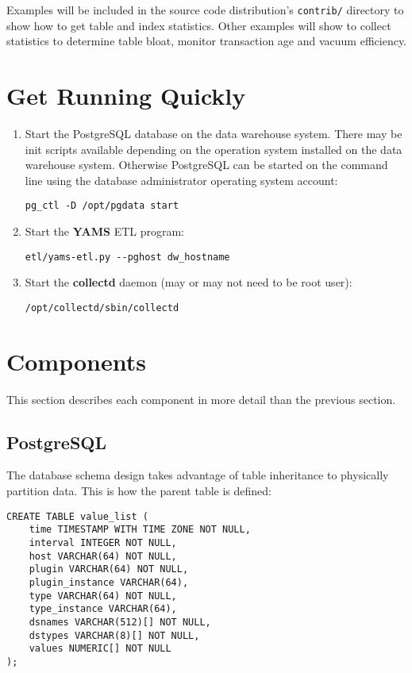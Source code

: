 \documentclass[a4paper,twoside,12pt]{article}
\begin{document}
Examples will be included in the source code distribution's \texttt{contrib/}
directory to show how to get table and index statistics.  Other examples will
show to collect statistics to determine table bloat, monitor transaction age
and vacuum efficiency.

\section{Get Running Quickly}

\begin{enumerate}
  \item Start the PostgreSQL database on the data warehouse system.  There may
        be init scripts available depending on the operation system installed
        on the data warehouse system.  Otherwise PostgreSQL can be started on
        the command line using the database administrator operating system
        account:
        \lstset{language=sh}
        \begin{lstlisting}
pg_ctl -D /opt/pgdata start
        \end{lstlisting}
  \item Start the \textbf{YAMS} ETL program:
        \lstset{language=sh}
        \begin{lstlisting}
etl/yams-etl.py --pghost dw_hostname
        \end{lstlisting}
  \item Start the \textbf{collectd} daemon (may or may not need to be root
        user):
        \lstset{language=sh}
        \begin{lstlisting}
/opt/collectd/sbin/collectd
        \end{lstlisting}
\end{enumerate}

\section{Components}

This section describes each component in more detail than the previous section.

\subsection{PostgreSQL}

The database schema design takes advantage of table inheritance to physically
partition data.  This is how the parent table is defined:
\lstset{language=sql}
\begin{lstlisting}
CREATE TABLE value_list (
    time TIMESTAMP WITH TIME ZONE NOT NULL,
    interval INTEGER NOT NULL,
    host VARCHAR(64) NOT NULL,
    plugin VARCHAR(64) NOT NULL,
    plugin_instance VARCHAR(64),
    type VARCHAR(64) NOT NULL,
    type_instance VARCHAR(64),
    dsnames VARCHAR(512)[] NOT NULL,
    dstypes VARCHAR(8)[] NOT NULL,
    values NUMERIC[] NOT NULL
);
\end{lstlisting}
\end{document}
